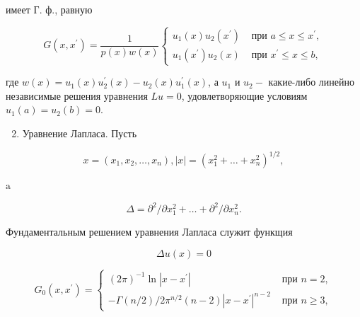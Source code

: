 \documentclass[10pt]{article}
\begin{document}
имеет Г. ф., равную



\[

G\left(x, x^{\prime}\right)=\frac{1}{p(x) w(x)} \begin{cases}u_{1}(x) u_{2}\left(x^{\prime}\right) & \text { при } a \leqslant x \leqslant x^{\prime}, \\ u_{1}\left(x^{\prime}\right) u_{2}(x) & \text { при } x^{\prime} \leqslant x \leqslant b,\end{cases}

\]



где $w(x)=u_{1}(x) u_{2}^{\prime}(x)-u_{2}(x) u_{1}^{\prime}(x)$, а $u_{1}$ и $u_{2}-$ какие-либо линейно независимые решения уравнения $L u=0$, удовлетворяющие условиям $u_{1}(a)=u_{2}(b)=0$.



\begin{enumerate}

  \setcounter{enumi}{1}

  \item Уравнение Лапласа. Пусть

\end{enumerate}



\[

x=\left(x_{1}, x_{2}, \ldots, x_{n}\right),|x|=\left(x_{1}^{2}+\ldots+x_{n}^{2}\right)^{1 / 2},

\]



$\mathrm{a}$



\[

\Delta=\partial^{2} / \partial x_{1}^{2}+\ldots+\partial^{2} / \partial x_{n}^{2} .

\]



Фундаментальным решением уравнения Лапласа служит функщия



\[

\Delta u(x)=0

\]



\[

G_{0}\left(x, x^{\prime}\right)= \begin{cases}(2 \pi)^{-1} \ln \left|x-x^{\prime}\right| & \text { при } n=2, \\ -\Gamma(n / 2) / 2 \pi^{n / 2}(n-2)\left|x-x^{\prime}\right|^{n-2} & \text { при } n \geqslant 3,\end{cases}

\]
\end{document}
